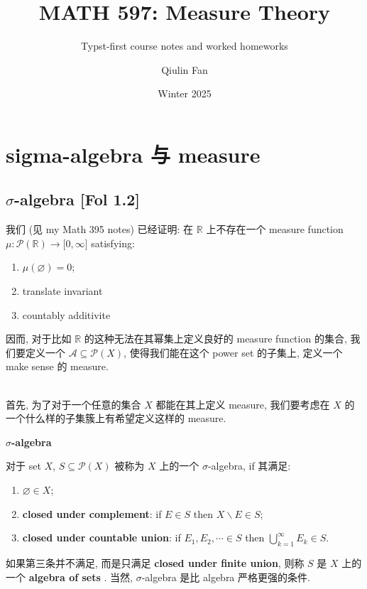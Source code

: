 \documentclass{qlnotes-export}
\title{MATH 597: Measure Theory}
\subtitle{Typst-first course notes and worked homeworks}
\author{Qiulin Fan}
\date{Winter 2025}
\begin{document}
\mainmatter
\chapter{sigma-algebra 与 measure}\label{sigma-algebra-ux4e0e-measure}

\section{\texorpdfstring{\(\sigma\)-algebra {[}Fol 1.2{]}}{\textbackslash sigma-algebra {[}Fol 1.2{]}}}

我们 (见 my Math 395 notes) 已经证明: 在 \(\mathbb{R}\) 上不存在一个 measure function \(\mu:\mathcal{P}({\mathbb{R}})\rightarrow\lbrack 0,\infty\rbrack\) satisfying:

\begin{enumerate}
\item
  \(\mu(\varnothing) = 0\);
\item
  translate invariant
\item
  countably additivite
\end{enumerate}

因而, 对于比如 \(\mathbb{R}\) 的这种无法在其幂集上定义良好的 measure function 的集合, 我们要定义一个 \(\mathcal{A} \subseteq \mathcal{P}(X)\), 使得我们能在这个 power set 的子集上, 定义一个 make sense 的 measure.\\
\strut \\
首先, 为了对于一个任意的集合 \(X\) 都能在其上定义 measure, 我们要考虑在 \(X\) 的一个什么样的子集簇上有希望定义这样的 measure.

\begin{definition}{\protect{}\label{kn-sigma-algebra}{\textbf{\(\sigma\)-algebra}}}

对于 set \(X\), \(S \subseteq \mathcal{P}(X)\) 被称为 \(X\) 上的一个 \(\sigma\)-algebra, if 其满足:

\begin{enumerate}
\item
  \(\varnothing \in X\);
\item
  \textbf{closed under complement}: if \(E \in S\) then \(X\backslash E \in S\);
\item
  \textbf{closed under countable union}: if \(E_{1},E_{2},\cdots \in S\) then \(\bigcup_{k = 1}^{\infty}E_{k} \in S\).
\end{enumerate}

如果第三条并不满足, 而是只满足 \textbf{closed under finite union}, 则称 \(S\) 是 \(X\) 上的一个 \protect{}\label{kn-algebra-of-sets}{\textbf{algebra of sets}} . 当然, \(\sigma\)-algebra 是比 algebra 严格更强的条件.

\end{definition}
\end{document}
